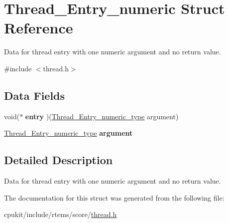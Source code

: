 \hypertarget{structThread__Entry__numeric}{}\section{Thread\+\_\+\+Entry\+\_\+numeric Struct Reference}
\label{structThread__Entry__numeric}


Data for thread entry with one numeric argument and no return value.  




{\ttfamily \#include $<$thread.\+h$>$}

\subsection*{Data Fields}
\begin{DoxyCompactItemize}
\item 
\mbox{\label{structThread__Entry__numeric_a9b7f8766512653320f8378947d45a98b}} 
void($\ast$ {\bfseries entry} )(\mbox{\hyperlink{group__RTEMSScoreThread_gab56e437830bb9a4af5b27ac7ec503b6a}{Thread\+\_\+\+Entry\+\_\+numeric\+\_\+type}} argument)
\item 
\mbox{\label{structThread__Entry__numeric_a7207f7296e9886a3057cec09093bce8a}} 
\mbox{\hyperlink{group__RTEMSScoreThread_gab56e437830bb9a4af5b27ac7ec503b6a}{Thread\+\_\+\+Entry\+\_\+numeric\+\_\+type}} {\bfseries argument}
\end{DoxyCompactItemize}


\subsection{Detailed Description}
Data for thread entry with one numeric argument and no return value. 

The documentation for this struct was generated from the following file\+:\begin{DoxyCompactItemize}
\item 
cpukit/include/rtems/score/\mbox{\hyperlink{score_2thread_8h}{thread.\+h}}\end{DoxyCompactItemize}
